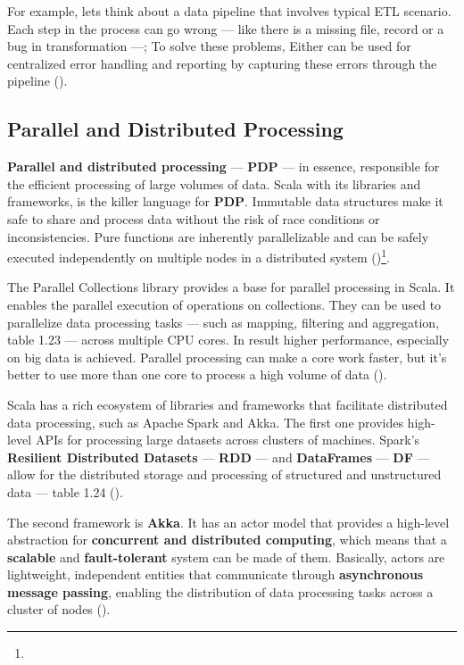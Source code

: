 For example, lets think about a data pipeline that involves typical ETL scenario. Each step in the process can go wrong — like there is a missing file, record or a bug in transformation —; To solve these problems, Either can be used for centralized error handling and reporting by capturing these errors through the pipeline (\cite{joshuad.suerethScalaDepth2012})\footnotemark[4].



\subsection{Parallel and Distributed Processing}

\textbf{Parallel and distributed processing} — \textbf{PDP} — in essence, responsible for the efficient processing of large volumes of data. Scala with its libraries and frameworks, is the killer language for \textbf{PDP}. Immutable data structures make it safe to share and process data without the risk of race conditions or inconsistencies. Pure functions are inherently parallelizable and can be safely executed independently on multiple nodes in a distributed system (\cite{tomeDataEngineeringScala2024})\footnote[10]{}.

The Parallel Collections library provides a base for parallel processing in Scala. It enables the parallel execution of operations on collections. They can be used to parallelize data processing tasks — such as mapping, filtering and aggregation, table 1.23 — across multiple CPU cores. In result higher performance, especially on big data is achieved. Parallel processing can make a core work faster, but it's better to use more than one core to process a high volume of data (\cite{tomeDataEngineeringScala2024})\footnotemark[10].



Scala has a rich ecosystem of libraries and frameworks that facilitate distributed data processing, such as Apache Spark and Akka. The first one provides high-level APIs for processing large datasets across clusters of machines. Spark's \textbf{Resilient Distributed Datasets} — \textbf{RDD} — and \textbf{DataFrames} — \textbf{DF} — allow for the distributed storage and processing of structured and unstructured data — table 1.24 (\cite{tomeDataEngineeringScala2024})\footnotemark[10].



The second framework is \textbf{Akka}. It has an actor model that provides a high-level abstraction for \textbf{concurrent and distributed computing}, which means that a \textbf{scalable} and \textbf{fault-tolerant} system can be made of them. Basically, actors are lightweight, independent entities that communicate through \textbf{asynchronous message passing}, enabling the distribution of data processing tasks across a cluster of nodes (\cite{tomeDataEngineeringScala2024})\footnotemark[10].

